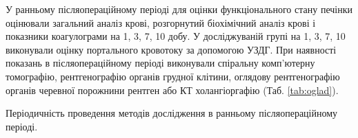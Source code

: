 У ранньому післяопераційному періоді для оцінки функціонального стану печінки оцінювали загальний аналіз крові, розгорнутий біохімічний аналіз крові і показники коагулограми на 1, 3, 7, 10 добу. У досліджуваній групі на 1, 3, 7, 10 виконували оцінку портального кровотоку за допомогою УЗДГ. При наявності показань в післяопераційному періоді виконували спіральну комп'ютерну томографію, рентгенографію органів грудної клітини, оглядову рентгенографію органів черевної порожнини рентген або КТ холангіоргафію (Таб. \ref{tab:oglad}).  

\begin{table}[]
\centering
\caption{Періодичність проведення методів дослідження в ранньому післяопераційному періоді. }
\label{tab:oglad}


\end{table}
